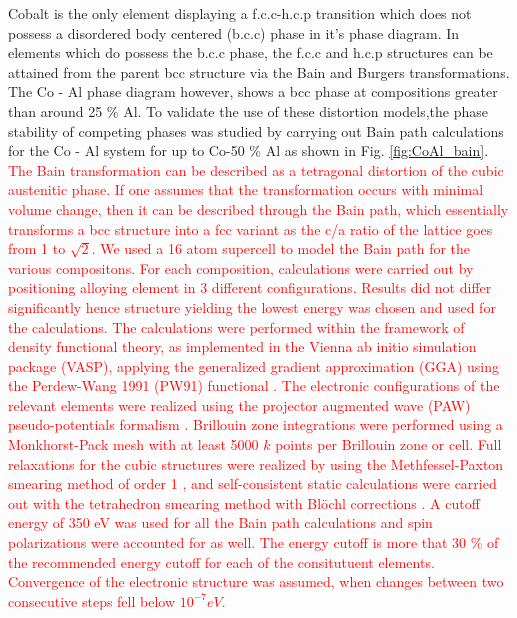 \documentclass[preprint]{elsarticle}
\begin{document}
Cobalt is the only element displaying a f.c.c-h.c.p transition which does not possess a disordered body centered (b.c.c) phase in it's phase diagram. In elements which do possess the b.c.c phase,  the f.c.c and h.c.p structures can be attained from the  parent bcc structure via the Bain\cite{bain1924}  and Burgers\cite{Burgers1934} transformations. The Co - Al phase diagram however, shows a bcc phase at compositions greater than around 25 \% Al. To validate the use of these distortion models,the phase stability of competing phases was studied by carrying out Bain path calculations for the Co - Al system for up to Co-50 \% Al as shown in Fig. \ref{fig:CoAl_bain}.
\textcolor{red}{The Bain transformation can be described as a tetragonal distortion of the cubic austenitic phase. If one assumes that the transformation occurs with minimal volume change, then it can be described through the Bain path, which essentially transforms a bcc structure into a fcc variant as the c/a ratio of the lattice goes from 1 to $\sqrt{2}$. We used a 16 atom supercell to model the Bain path for the various compositons. For each composition, calculations were carried out by positioning alloying element in 3 different configurations. Results did not differ significantly hence structure yielding the lowest energy was chosen and used for the calculations.
The calculations were performed within the framework of density functional theory, as implemented in the Vienna ab initio simulation package (VASP)\cite{kresse1996software}, applying the generalized gradient approximation (GGA) using the Perdew-Wang 1991 (PW91) functional \cite{Perdew1992}.  The electronic configurations of the relevant elements were realized using  the projector augmented wave (PAW) pseudo-potentials formalism \cite{blochl1994paw}. Brillouin zone integrations were performed using a Monkhorst-Pack mesh \cite{monkhorst1976} with at least 5000 $k$ points per Brillouin zone or cell. Full relaxations for the cubic structures were realized by using the Methfessel-Paxton smearing method of order 1 \cite{methfessel1989}, and self-consistent static calculations were carried out  with the tetrahedron smearing method with Bl\"{o}chl  corrections \cite{blochl1994improved}. A cutoff energy of 350 eV was used for all the  Bain path calculations and spin polarizations were accounted for as well. The energy cutoff is more that 30 \% of the recommended energy cutoff for each of the consitutuent elements. Convergence of the electronic structure was assumed, when changes between two consecutive steps fell below $10^{-7} eV$.}
\end{document}
